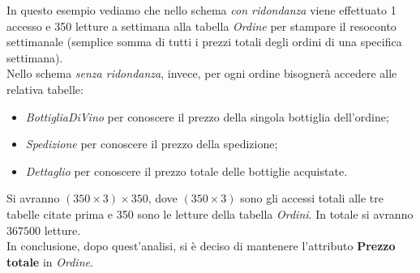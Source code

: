 \begin{flushleft}
In questo esempio vediamo che nello schema \emph{con ridondanza} viene effettuato 1 accesso e 350 letture a settimana alla tabella \emph{Ordine} per stampare il resoconto settimanale (semplice somma di tutti i prezzi totali degli ordini di una specifica settimana).\\
\vspace{0.5cm}
Nello schema \emph{senza ridondanza}, invece, per ogni ordine bisognerà accedere alle relativa tabelle:
\begin{itemize}
	\item \emph{BottigliaDiVino} per conoscere il prezzo della singola bottiglia dell'ordine;
	\item \emph{Spedizione} per conoscere il prezzo della spedizione;
	\item \emph{Dettaglio} per conoscere il prezzo totale delle bottiglie acquistate.
\end{itemize}
Si avranno $(350\times3)\times350$, dove $(350\times3)$ sono gli accessi totali alle tre tabelle citate prima e 350 sono le letture della tabella \emph{Ordini}. In totale si avranno $367500$ letture.\\
\vspace{0.5cm}
In conclusione, dopo quest'analisi, si è deciso di mantenere l'attributo \textbf{Prezzo totale} in \emph{Ordine}.
\end{flushleft}
